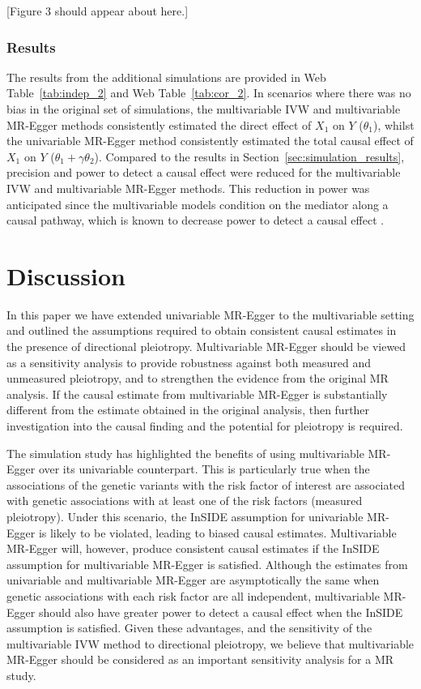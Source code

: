 \documentclass[a4paper,12pt]{article}
\begin{document}
\begin{bibunit}[wileyj]
\begin{center}
[Figure 3 should appear about here.]
\end{center}

\subsubsection{Results}
The results from the additional simulations are provided in Web Table~\ref{tab:indep_2} and Web Table~\ref{tab:cor_2}. In scenarios where there was no bias in the original set of simulations, the multivariable IVW and multivariable MR-Egger methods consistently estimated the direct effect of $X_1$ on $Y$ ($\theta_1$), whilst the univariable MR-Egger method consistently estimated the total causal effect of $X_1$ on $Y$ ($\theta_1 + \gamma\theta_2$). Compared to the results in Section~\ref{sec:simulation_results}, precision and power to detect a causal effect were reduced for the multivariable IVW and multivariable MR-Egger methods. This reduction in power was anticipated since the multivariable models condition on the mediator along a causal pathway, which is known to decrease power to detect a causal effect \cite{Fritz2007}.  

\pagebreak
\section{Discussion}
\label{sec:discussion}
In this paper we have extended univariable MR-Egger to the multivariable setting and outlined the assumptions required to obtain consistent causal estimates in the presence of directional pleiotropy. Multivariable MR-Egger should be viewed as a sensitivity analysis to provide robustness against both measured and unmeasured pleiotropy, and to strengthen the evidence from the original MR analysis. If the causal estimate from multivariable MR-Egger is substantially different from the estimate obtained in the original analysis, then further investigation into the causal finding and the potential for pleiotropy is required.

The simulation study has highlighted the benefits of using multivariable MR-Egger over its univariable counterpart. This is particularly true when the associations of the genetic variants with the risk factor of interest are associated with genetic associations with at least one of the risk factors (measured pleiotropy). Under this scenario, the InSIDE assumption for univariable MR-Egger is likely to be violated, leading to biased causal estimates. Multivariable MR-Egger will, however, produce consistent causal estimates if the InSIDE assumption for multivariable MR-Egger is satisfied.  Although the estimates from univariable and multivariable MR-Egger are asymptotically the same when genetic associations with each risk factor are all independent, multivariable MR-Egger should also have greater power to detect a causal effect when the InSIDE assumption is satisfied. Given these advantages, and the sensitivity of the multivariable IVW method to directional pleiotropy, we believe that multivariable MR-Egger should be considered as an important sensitivity analysis for a MR study.


\end{bibunit}
\end{document}

